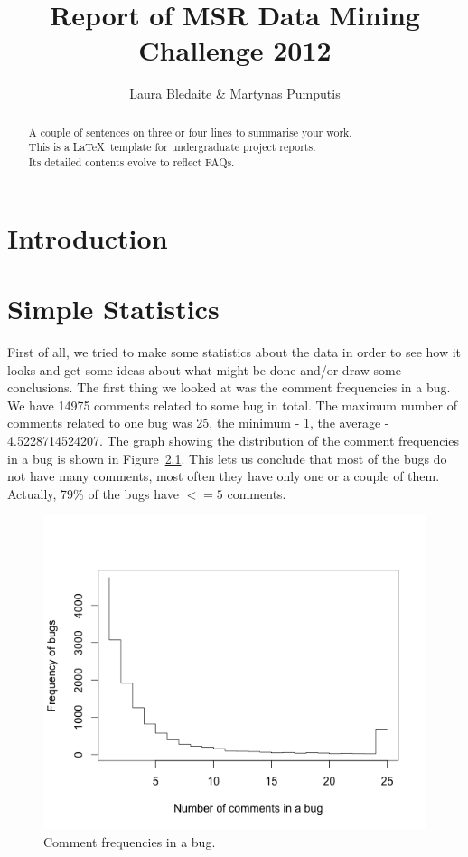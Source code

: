 \documentclass[a4paper,11pt]{report}
\begin{document}
\title{Report of MSR Data Mining Challenge 2012}
\author{Laura Bledaite \& Martynas Pumputis}
\maketitle
\begin{abstract}\centering
A couple of sentences on three or four lines to summarise your work.\\ 
This is a \LaTeX\ template for undergraduate project reports.\\
Its detailed contents evolve to reflect FAQs.
\end{abstract}
\tableofcontents
\chapter{Introduction}
\chapter{Simple Statistics}
First of all, we tried to make some statistics about the data in order to see how it looks and get some ideas about what might be done and/or draw some conclusions.
The first thing we looked at was the comment frequencies in a bug. We have 14975 comments related to some bug in total. The maximum number of comments related to one bug was 25, the minimum - 1, the average - 4.5228714524207. The graph showing the distribution of the comment frequencies in a bug is shown in Figure~\ref{fig:com_freq}. This lets us conclude that most of the bugs do not have many comments, most often they have only one or a couple of them. Actually, 79\% of the bugs have $<=5$ comments.

\begin{figure}[ht!]
\centering
\includegraphics[width=.7\textwidth]{comment_frequencies.png}
\caption{Comment frequencies in a bug.}
\label{fig:com_freq}
\end{figure}
\end{document}
